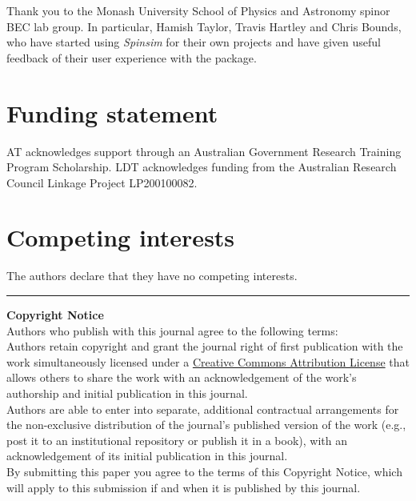 \documentclass{jors}
\begin{document}
Thank you to the Monash University School of Physics and Astronomy spinor BEC lab group. In particular, Hamish Taylor, Travis Hartley and Chris Bounds, who have started using \emph{Spinsim} for their own projects and have given useful feedback of their user experience with the package.

\section{Funding statement}

AT acknowledges support through an Australian Government Research Training Program Scholarship.
LDT acknowledges funding from the Australian Research Council Linkage Project LP200100082.

\section{Competing interests}

The authors declare that they have no competing interests.

{}


\vspace{2cm}

\rule{\textwidth}{1pt}

{ \bf Copyright Notice} \\
Authors who publish with this journal agree to the following terms: \\

Authors retain copyright and grant the journal right of first publication with the work simultaneously licensed under a  \href{http://creativecommons.org/licenses/by/3.0/}{Creative Commons Attribution License} that allows others to share the work with an acknowledgement of the work's authorship and initial publication in this journal. \\

Authors are able to enter into separate, additional contractual arrangements for the non-exclusive distribution of the journal's published version of the work (e.g., post it to an institutional repository or publish it in a book), with an acknowledgement of its initial publication in this journal. \\

By submitting this paper you agree to the terms of this Copyright Notice, which will apply to this submission if and when it is published by this journal.
\end{document}
